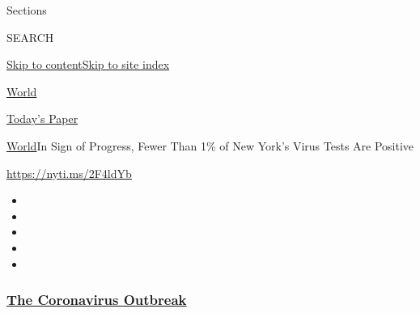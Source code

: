 Sections

SEARCH

\protect\hyperlink{site-content}{Skip to
content}\protect\hyperlink{site-index}{Skip to site index}

\href{https://www.nytimes3xbfgragh.onion/section/world}{World}

\href{https://myaccount.nytimes3xbfgragh.onion/auth/login?response_type=cookie\&client_id=vi}{}

\href{https://www.nytimes3xbfgragh.onion/section/todayspaper}{Today's
Paper}

\href{/section/world}{World}\textbar{}In Sign of Progress, Fewer Than
1\% of New York's Virus Tests Are Positive

\url{https://nyti.ms/2F4ldYb}

\begin{itemize}
\item
\item
\item
\item
\item
\end{itemize}

\hypertarget{the-coronavirus-outbreak}{%
\subsubsection{\texorpdfstring{\href{https://www.nytimes3xbfgragh.onion/news-event/coronavirus?name=styln-coronavirus-national\&region=TOP_BANNER\&block=storyline_menu_recirc\&action=click\&pgtype=Article\&impression_id=11146f00-f287-11ea-8c2a-475020e0db7d\&variant=undefined}{The
Coronavirus
Outbreak}}{The Coronavirus Outbreak}}\label{the-coronavirus-outbreak}}

